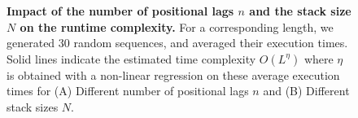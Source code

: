 \begin{figure}[t!]
	\centering
	\begin{minipage}[b]{.5\linewidth}
		\centering		
		 \hfill
	\end{minipage}%
	\begin{minipage}[b]{.5\linewidth}
	\centering
\end{minipage}%

	\caption{\label{Fig:scalability}\textbf{Impact of the number of positional lags $n$ and the stack size $N$ on the runtime complexity.} For a corresponding length, we generated $30$ random sequences, and averaged their execution times. Solid lines indicate the estimated time complexity $O(L^\eta)$ where $\eta$ is obtained with a non-linear regression on these average execution times for (A) Different number of positional lags $n$ and (B) Different stack sizes $N$.}
\end{figure} 

